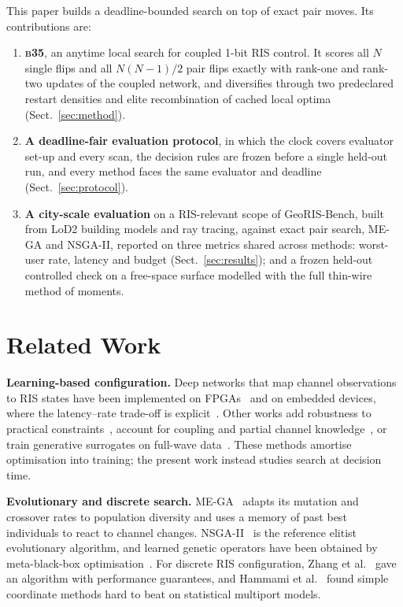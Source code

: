 \documentclass[runningheads]{llncs}
\newcommand{\bts}{\textsc{b35}}
\begin{document}
This paper builds a deadline-bounded search on top of exact pair moves. Its contributions are:
\begin{enumerate}
\item \textbf{\bts{}}, an anytime local search for coupled 1-bit RIS control. It scores all $N$ single flips and all $N(N-1)/2$ pair flips exactly with rank-one and rank-two updates of the coupled network, and diversifies through two predeclared restart densities and elite recombination of cached local optima (Sect.~\ref{sec:method}).
\item \textbf{A deadline-fair evaluation protocol}, in which the clock covers evaluator set-up and every scan, the decision rules are frozen before a single held-out run, and every method faces the same evaluator and deadline (Sect.~\ref{sec:protocol}).
\item \textbf{A city-scale evaluation} on a RIS-relevant scope of GeoRIS-Bench, built from LoD2 building models and ray tracing, against exact pair search, ME-GA and NSGA-II, reported on three metrics shared across methods: worst-user rate, latency and budget (Sect.~\ref{sec:results}); and a frozen held-out controlled check on a free-space surface modelled with the full thin-wire method of moments.
\end{enumerate}

\section{Related Work}\label{sec:related}
\textbf{Learning-based configuration.} Deep networks that map channel observations to RIS states have been implemented on FPGAs~\cite{martin2024hardware,padial2026accelerating} and on embedded devices, where the latency--rate trade-off is explicit~\cite{urbinati2026ondevice}. Other works add robustness to practical constraints~\cite{xu2022robust}, account for coupling and partial channel knowledge~\cite{peng2025risnet}, or train generative surrogates on full-wave data~\cite{liu2026physics}. These methods amortise optimisation into training; the present work instead studies search at decision time.

\textbf{Evolutionary and discrete search.} ME-GA~\cite{zardi2024memory} adapts its mutation and crossover rates to population diversity and uses a memory of past best individuals to react to channel changes. NSGA-II~\cite{deb2002fast} is the reference elitist evolutionary algorithm, and learned genetic operators have been obtained by meta-black-box optimisation~\cite{lange2023discovering}. For discrete RIS configuration, Zhang et al.~\cite{zhang2022configuring} gave an algorithm with performance guarantees, and Hammami et al.~\cite{hammami2026statistical} found simple coordinate methods hard to beat on statistical multiport models.
\end{document}
